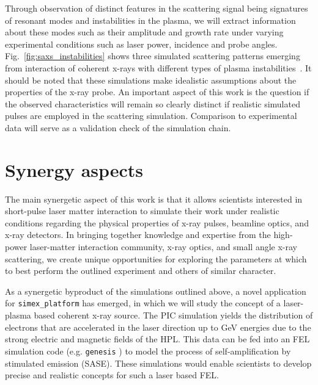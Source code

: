 \documentclass[12pt]{scrartcl}
\begin{document}
Through observation of distinct features in the
scattering signal being signatures of resonant modes and instabilities in the
plasma, we will extract information about these modes such as their amplitude
and growth rate under varying experimental conditions such as laser power,
incidence and probe angles. Fig.~\ref{fig:saxs_instabilities} shows three
simulated scattering patterns emerging from interaction of coherent x-rays with
different types of plasma instabilities~\cite{Kluge2014}.
It should be noted that these simulations make idealistic assumptions about the
properties of the x-ray probe. An important aspect of this work is the question
if the observed characteristics will remain so clearly distinct if realistic
simulated pulses are employed in the scattering simulation. Comparison to experimental
data will serve as a validation check of the simulation chain.

\section{Synergy aspects}

The main synergetic aspect of this work is that it allows scientists interested
in short-pulse laser matter interaction to simulate their work under realistic
conditions regarding the physical properties of x-ray pulses, beamline optics,
and x-ray detectors.
In bringing together knowledge and expertise from the high-power
laser-matter interaction community, x-ray optics, and small angle x-ray
scattering, we create unique opportunities for exploring the parameters
at which to best perform the outlined experiment and others of similar character.

As a synergetic byproduct of the simulations outlined above, a
novel application for \texttt{simex\_platform} has emerged,
in which we will
study the concept of a laser-plasma based coherent x-ray source. The PIC
simulation yields the distribution of electrons that are accelerated in the
laser direction up to GeV energies due to the strong electric and
magnetic fields of the HPL. This data can be fed into an FEL simulation code
(e.g. \texttt{genesis} \cite{Reiche1999}) to model the process of
self-amplification by stimulated emission (SASE). These simulations would enable
scientists to develop precise and realistic concepts for such a laser based FEL.
\end{document}
